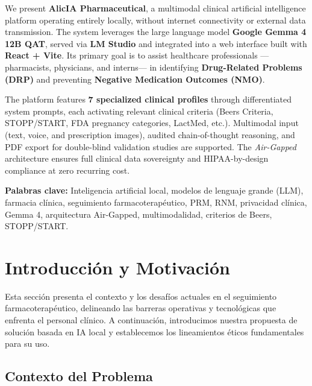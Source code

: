 \documentclass[12pt,a4paper]{article}
\begin{document}
\begin{infobox}
  We present \textbf{AlicIA Pharmaceutical}, a multimodal clinical artificial intelligence platform
  operating entirely locally, without internet connectivity or external data transmission.
  The system leverages the large language model \textbf{Google Gemma 4 12B QAT}, served via
  \textbf{LM Studio} and integrated into a web interface built with \textbf{React + Vite}.
  Its primary goal is to assist healthcare professionals ---pharmacists, physicians, and interns---
  in identifying \textbf{Drug-Related Problems (DRP)} and preventing \textbf{Negative Medication
  Outcomes (NMO)}.

  The platform features \textbf{7 specialized clinical profiles} through differentiated system
  prompts, each activating relevant clinical criteria (Beers Criteria, STOPP/START, FDA pregnancy
  categories, LactMed, etc.). Multimodal input (text, voice, and prescription images), audited
  chain-of-thought reasoning, and PDF export for double-blind validation studies are supported.
  The \textit{Air-Gapped} architecture ensures full clinical data sovereignty and HIPAA-by-design
  compliance at zero recurring cost.
\end{infobox}

\vspace{0.5cm}

\noindent\textbf{Palabras clave:} Inteligencia artificial local, modelos de lenguaje grande (LLM),
farmacia clínica, seguimiento farmacoterapéutico, PRM, RNM, privacidad clínica, Gemma 4,
arquitectura Air-Gapped, multimodalidad, criterios de Beers, STOPP/START.

\newpage

\section{Introducción y Motivación}

Esta sección presenta el contexto y los desafíos actuales en el seguimiento farmacoterapéutico, delineando las barreras operativas y tecnológicas que enfrenta el personal clínico. A continuación, introducimos nuestra propuesta de solución basada en IA local y establecemos los lineamientos éticos fundamentales para su uso.

\subsection{Contexto del Problema}
\end{document}
